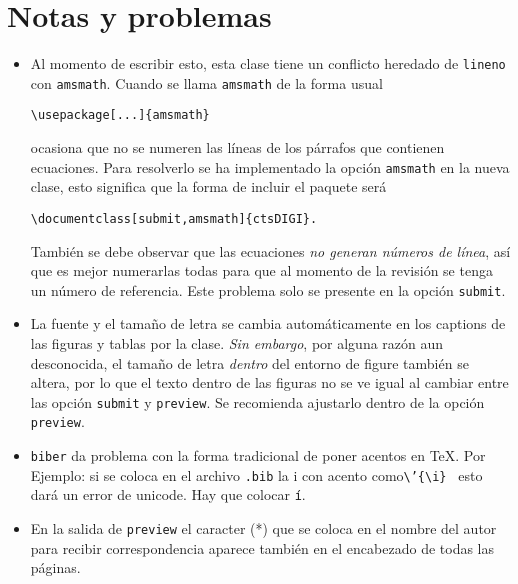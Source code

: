 \documentclass{article}
\begin{document}



\section{Notas y problemas}
\begin{itemize}
\item Al momento de escribir esto, esta clase tiene un conflicto heredado de \texttt{lineno} con  \texttt{amsmath}. Cuando se llama \texttt{amsmath} de la forma usual
\begin{verbatim}
\usepackage[...]{amsmath}
\end{verbatim}
ocasiona que no se numeren las líneas de los párrafos que contienen ecuaciones. Para resolverlo se ha implementado la opción \texttt{amsmath} en la nueva clase, esto significa que la forma de incluir el paquete será
\begin{verbatim}
\documentclass[submit,amsmath]{ctsDIGI}.
\end{verbatim}
También se debe observar que las ecuaciones \emph{no generan números de línea}, así que es mejor numerarlas todas para que al momento de la revisión se tenga un número de referencia. Este problema solo se presente en la opción \texttt{submit}.

\item La fuente y el tamaño de letra se cambia automáticamente en los captions de las figuras y tablas por la clase. \emph{Sin embargo}, por alguna razón aun desconocida, el tamaño de letra \emph{dentro} del entorno de figure también se altera, por lo que el texto dentro de las figuras no se ve igual al cambiar entre las opción \texttt{submit} y \texttt{preview}. Se recomienda ajustarlo dentro de la opción \texttt{preview}.

\item \texttt{biber} da problema con la forma tradicional de poner acentos en \TeX. Por Ejemplo: si se coloca en el archivo \texttt{.bib} la i con acento como\texttt{\textbackslash'\{\textbackslash i\} } esto dará un error de unicode. Hay que colocar \texttt{í}.

\item En la salida de \texttt{preview} el caracter (*) que se coloca en el nombre del autor para recibir correspondencia aparece también en el encabezado de todas las páginas.

\end{itemize}
\end{document}
